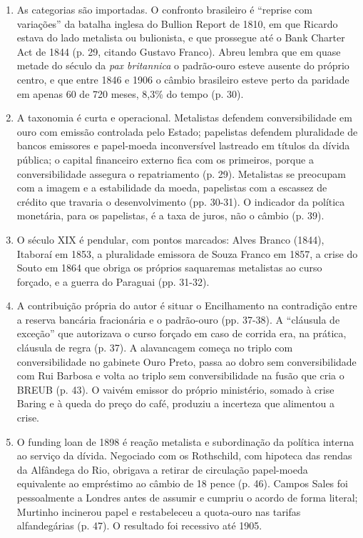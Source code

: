 \begin{enumerate}[leftmargin=*,nosep]
\item As categorias são importadas. O confronto brasileiro é ``reprise com
variações'' da batalha inglesa do Bullion Report de 1810, em que Ricardo estava do
lado metalista ou bulionista, e que prossegue até o Bank Charter Act de 1844
(p. 29, citando Gustavo Franco). Abreu lembra que em quase metade do século da
\emph{pax britannica} o padrão-ouro esteve ausente do próprio centro, e que entre
1846 e 1906 o câmbio brasileiro esteve perto da paridade em apenas 60 de 720
meses, 8,3\% do tempo (p. 30).

\item A taxonomia é curta e operacional. Metalistas defendem conversibilidade em
ouro com emissão controlada pelo Estado; papelistas defendem pluralidade de
bancos emissores e papel-moeda inconversível lastreado em títulos da dívida
pública; o capital financeiro externo fica com os primeiros, porque a
conversibilidade assegura o repatriamento (p. 29). Metalistas se preocupam com a
imagem e a estabilidade da moeda, papelistas com a escassez de crédito que
travaria o desenvolvimento (pp. 30-31). O indicador da política monetária, para
os papelistas, é a taxa de juros, não o câmbio (p. 39).


\item O século XIX é pendular, com pontos marcados: Alves Branco (1844), Itaboraí
em 1853, a pluralidade emissora de Souza Franco em 1857, a crise do Souto em 1864
que obriga os próprios saquaremas metalistas ao curso forçado, e a guerra do
Paraguai (pp. 31-32).

\item A contribuição própria do autor é situar o Encilhamento na contradição entre
a reserva bancária fracionária e o padrão-ouro (pp. 37-38). A ``cláusula de
exceção'' que autorizava o curso forçado em caso de corrida era, na prática,
cláusula de regra (p. 37). A alavancagem começa no triplo com conversibilidade no
gabinete Ouro Preto, passa ao dobro sem conversibilidade com Rui Barbosa e volta
ao triplo sem conversibilidade na fusão que cria o BREUB (p. 43). O vaivém emissor
do próprio ministério, somado à crise Baring e à queda do preço do café, produziu
a incerteza que alimentou a crise.

\item O funding loan de 1898 é reação metalista e subordinação da política interna
ao serviço da dívida. Negociado com os Rothschild, com hipoteca das rendas da
Alfândega do Rio, obrigava a retirar de circulação papel-moeda equivalente ao
empréstimo ao câmbio de 18 pence (p. 46). Campos Sales foi pessoalmente a Londres
antes de assumir e cumpriu o acordo de forma literal; Murtinho incinerou papel e
restabeleceu a quota-ouro nas tarifas alfandegárias (p. 47). O resultado foi
recessivo até 1905.


\end{enumerate}
